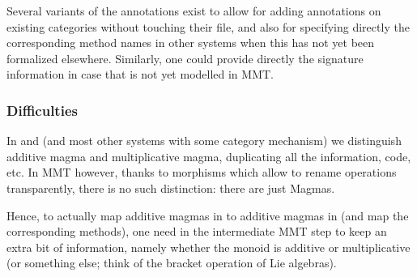 Several variants of the annotations exist to allow for adding
annotations on existing categories without touching their file, and also
for specifying directly the corresponding method names in other systems
when this has not yet been formalized elsewhere. Similarly, one could
provide directly the signature information in case that is not yet
modelled in MMT.

\subsubsection{Difficulties}\label{difficulties}

In \Sage and \GAP (and most other systems with some category
mechanism) we distinguish additive magma and multiplicative magma,
duplicating all the information, code, etc. In MMT however, thanks to
morphisms which allow to rename operations transparently, there is no
such distinction: there are just Magmas.

Hence, to actually map additive magmas in \Sage to additive magmas in
\GAP (and map the corresponding methods), one need in the intermediate
MMT step to keep an extra bit of information, namely whether the
monoid is additive or multiplicative (or something else; think of the
bracket operation of Lie algebras).


